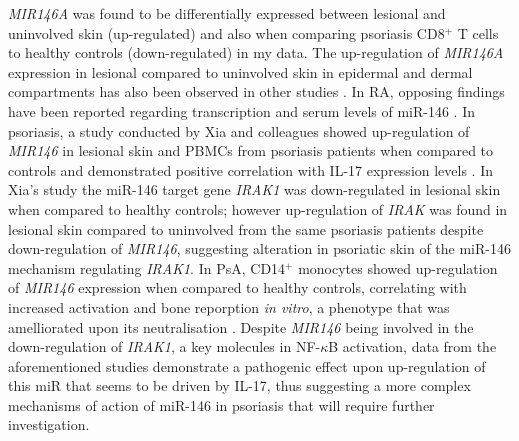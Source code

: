 \textit{MIR146A} was found to be differentially expressed between lesional and uninvolved skin (up-regulated) and also when comparing psoriasis CD8$^+$ T cells to healthy controls (down-regulated) in my data. The up-regulation of \textit{MIR146A} expression in lesional compared to uninvolved skin in epidermal and dermal compartments has also been observed in other studies \parencite{Tsoi2015,Li2014}. In RA, opposing findings have been reported regarding transcription and serum levels of miR-146 \parencite{Filkova2014,Churov2015}. In psoriasis, a study conducted by Xia and colleagues showed up-regulation of \textit{MIR146} in lesional skin and PBMCs from psoriasis patients when compared to controls and demonstrated positive correlation with IL-17 expression levels \parencite{Xia2012}. In Xia's study the miR-146 target gene \textit{IRAK1} was down-regulated in lesional skin when compared to healthy controls; however up-regulation of \textit{IRAK} was found in lesional skin compared to uninvolved from the same psoriasis patients despite down-regulation of \textit{MIR146}, suggesting alteration in psoriatic skin of the miR-146 mechanism regulating \textit{IRAK1}. In PsA, CD14$^+$ monocytes showed up-regulation of \textit{MIR146} expression when compared to healthy controls, correlating with increased activation and bone reporption \textit{in vitro}, a phenotype that was amelliorated upon its neutralisation \parencite{Lin2019}. Despite \textit{MIR146} being involved in the down-regulation of \textit{IRAK1}, a key molecules in NF-$\kappa$B activation, data from the aforementioned studies demonstrate a pathogenic effect upon up-regulation of this miR that seems to be driven by IL-17, thus suggesting a more complex mechanisms of action of miR-146 in psoriasis that will require further investigation.

